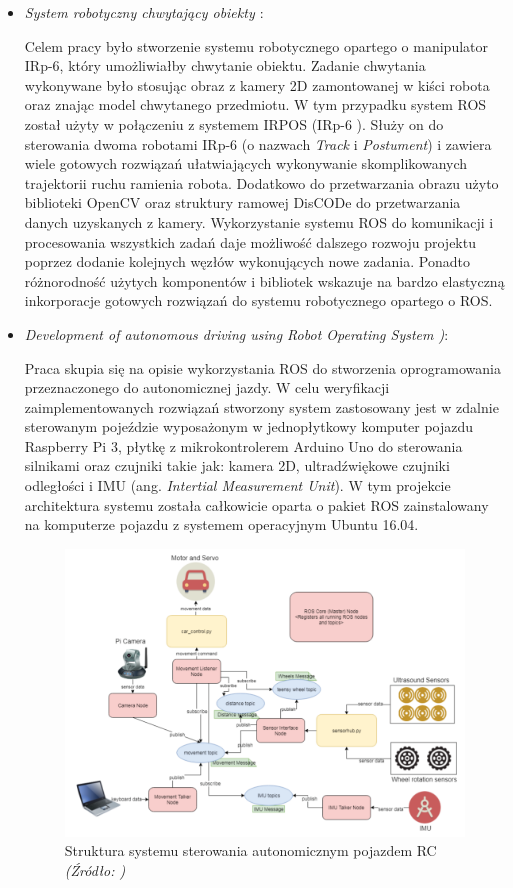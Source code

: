 \documentclass[a4paper, 12pt, twoside]{article}
\begin{document}
\begin{itemize}
\item \textit{System robotyczny chwytający obiekty \cite{thesiskarbarczyk}}:

Celem pracy było stworzenie systemu robotycznego opartego o manipulator IRp-6, który umożliwiałby chwytanie obiektu. Zadanie chwytania wykonywane było stosując obraz z kamery 2D zamontowanej w kiści robota oraz znając model chwytanego przedmiotu. W tym przypadku system ROS został użyty w połączeniu z systemem IRPOS (IRp-6 ). Służy on do sterowania dwoma robotami IRp-6 (o nazwach \textit{Track} i \textit{Postument}) i zawiera wiele gotowych rozwiązań ułatwiających wykonywanie skomplikowanych trajektorii ruchu ramienia robota. Dodatkowo do przetwarzania obrazu użyto biblioteki OpenCV oraz struktury ramowej DisCODe do przetwarzania danych uzyskanych z kamery. Wykorzystanie systemu ROS do komunikacji i procesowania wszystkich zadań daje możliwość dalszego rozwoju projektu poprzez dodanie kolejnych węzłów wykonujących nowe zadania. Ponadto różnorodność użytych komponentów i bibliotek wskazuje na bardzo elastyczną inkorporacje gotowych rozwiązań do systemu robotycznego opartego o ROS.

\item \textit{Development of autonomous driving using Robot Operating System \cite{thesiszivkovic})}:

Praca skupia się na opisie wykorzystania ROS do stworzenia oprogramowania przeznaczonego do autonomicznej jazdy. W celu weryfikacji zaimplementowanych rozwiązań stworzony system zastosowany jest w zdalnie sterowanym pojeździe wyposażonym w jednopłytkowy komputer pojazdu Raspberry Pi 3, płytkę z mikrokontrolerem Arduino Uno do sterowania silnikami oraz czujniki takie jak: kamera 2D, ultradźwiękowe czujniki odległości i IMU (ang. \textit{Intertial Measurement Unit}). W tym projekcie architektura systemu została całkowicie oparta o pakiet ROS zainstalowany na komputerze pojazdu z systemem operacyjnym Ubuntu 16.04.

\begin{figure}[hbt!]
\centering
\includegraphics[width=0.8\linewidth]{images/autonomous_car_system.png}
\caption{Struktura systemu sterowania autonomicznym pojazdem RC\textit{ (Źródło: \cite{thesiszivkovic}) } }
\label{fig:autonomous_car_scheme}
\end{figure}


\end{itemize}
\end{document}
